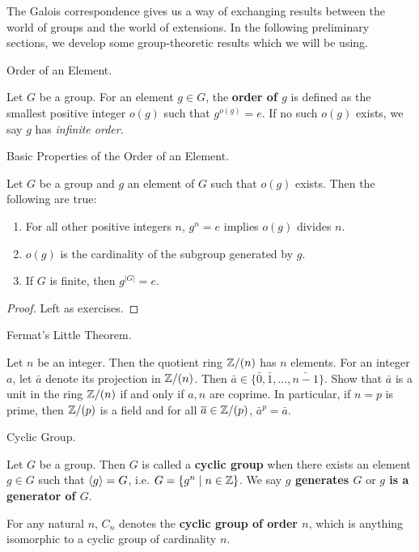 \documentclass[../../book.tex]{subfiles}
\begin{document}
The Galois correspondence gives us a way of exchanging results
between the world of groups and the world of extensions. 
In the following preliminary sections, 
we develop some group-theoretic results which we will be using. 

\begin{dfn} Order of an Element.
    
    Let $G$ be a group. 
    For an element $g \in G$, the \textbf{order of $g$} is defined as 
    the smallest positive integer $o(g)$ such that $g^{o(g)} = e$. 
    If no such $o(g)$ exists, we say $g$ has \emph{infinite order}. 

\end{dfn}
    
\begin{thm} Basic Properties of the Order of an Element.
    
    Let $G$ be a group and $g$ an element of $G$ such that $o(g)$ exists.
    Then the following are true: \begin{enumerate}
        \item For all other positive integers $n$, 
        $g^n = e$ implies $o(g)$ divides $n$.
        \item $o(g)$ is the cardinality of the subgroup generated by $g$.
        \item If $G$ is finite, then $g^{|G|} = e$.
    \end{enumerate}
\end{thm}
\begin{proof}
    Left as exercises. 
\end{proof}

\begin{ex} Fermat's Little Theorem.
    
    Let $n$ be an integer. 
    Then the quotient ring $\mathbb{Z} / (n)$ has $n$ elements.
    For an integer $a$, let $\bar{a}$ denote its projection in $\mathbb{Z} / (n)$.
    Then $\bar{a} \in \{\bar{0}, \bar{1}, \dots, \bar{n-1}\}$. 
    Show that $\bar{a}$ is a unit in the ring $\mathbb{Z} / (n)$
    if and only if $a, n$ are coprime. 
    In particular, if $n = p$ is prime, then $\mathbb{Z} / (p)$ is a field
    and for all $\overline{a} \in \mathbb{Z}/(p)$, $\bar{a}^p = \bar{a}$. 
    
\end{ex}
    
\begin{dfn} Cyclic Group.
    
    Let $G$ be a group. 
    Then $G$ is called a \textbf{cyclic group} when 
    there exists an element $g \in G$ such that $\langle g\rangle = G$,
    i.e. $G = \{ g^n \mid n \in \mathbb{Z}\}$.
    We say \textbf{$g$ generates $G$} or \textbf{$g$ is a generator of $G$}.
    
    For any natural $n$, $C_n$ denotes the \textbf{cyclic group of order $n$},
    which is anything isomorphic to a cyclic group of cardinality $n$. 
\end{dfn}
\end{document}
